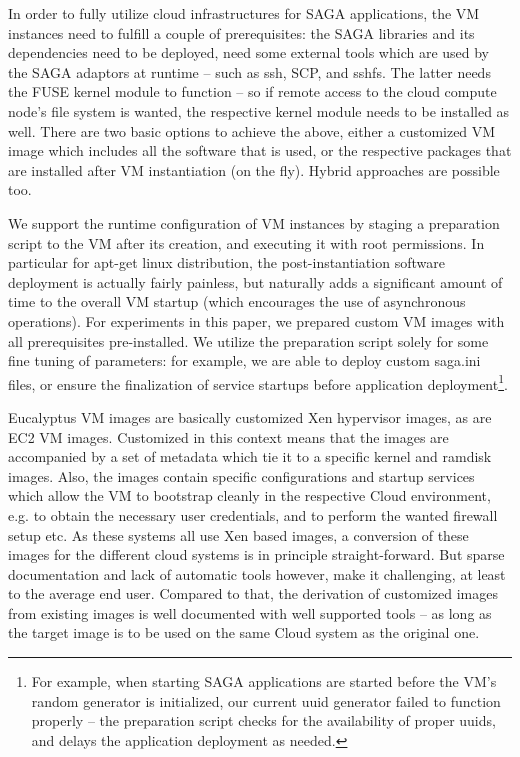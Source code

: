 \documentclass[3p,twocolumn]{elsarticle}
\begin{document}
In order to fully utilize cloud infrastructures for SAGA applications,
the VM instances need to fulfill a couple of prerequisites: the SAGA
libraries and its dependencies need to be deployed, need some external
tools which are used by the SAGA adaptors at runtime -- such as ssh,
SCP, and sshfs.  The latter needs the FUSE kernel module to function
-- so if remote access to the cloud compute node's file system is
wanted, the respective kernel module needs to be installed as well.
There are two basic options to achieve the above, either a customized
VM image which includes all the software that is used, or the
respective packages that are installed after VM instantiation (on the
fly).  Hybrid approaches are possible too.

We support the runtime configuration of VM instances by staging a
preparation script to the VM after its creation, and executing it with
root permissions.  In particular for apt-get linux distribution, the
post-instantiation software deployment is actually fairly painless,
but naturally adds a significant amount of time to the overall VM
startup (which encourages the use of asynchronous operations).
For experiments in this paper, we prepared custom VM images with all
prerequisites pre-installed.  We utilize the preparation script solely
for some fine tuning of parameters: for example, we are able to deploy
custom saga.ini files, or ensure the finalization of service startups
before application deployment\footnote{For example, when starting SAGA
  applications are started before the VM's random generator is
  initialized, our current uuid generator failed to function properly
  -- the preparation script checks for the availability of proper
  uuids, and delays the application deployment as needed.}.

 Eucalyptus VM images are basically customized
Xen hypervisor images, as are EC2 VM images.  Customized in this
context means that the images are accompanied by a set of metadata
which tie it to a specific kernel and ramdisk images.  Also, the
images contain specific configurations and startup services which
allow the VM to bootstrap cleanly in the respective Cloud environment,
e.g. to obtain the necessary user credentials, and to perform the
wanted firewall setup etc.  As these systems all use Xen based images,
a conversion of these images for the different cloud systems is in
principle straight-forward.  But sparse documentation and lack of
automatic tools however, make it challenging, at least to the average
end user. Compared to that, the derivation of customized images from
existing images is well documented with well supported tools -- as
long as the target image is to be used on the same Cloud system as the
original one.
\end{document}

